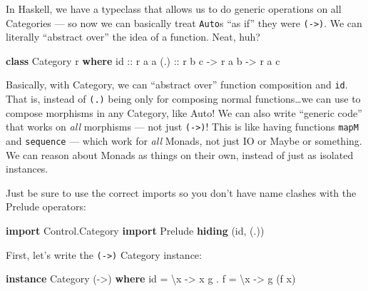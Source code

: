 \documentclass[]{article}
\newenvironment{Shaded}{}{}
\newcommand{\KeywordTok}[1]{\textcolor[rgb]{0.00,0.44,0.13}{\textbf{{#1}}}}
\newcommand{\DataTypeTok}[1]{\textcolor[rgb]{0.56,0.13,0.00}{{#1}}}
\newcommand{\OtherTok}[1]{\textcolor[rgb]{0.00,0.44,0.13}{{#1}}}
\newcommand{\FunctionTok}[1]{\textcolor[rgb]{0.02,0.16,0.49}{{#1}}}
\newcommand{\NormalTok}[1]{{#1}}
\begin{document}
In Haskell, we have a typeclass that allows us to do generic operations
on all Categories --- so now we can basically treat \texttt{Auto}s ``as
if'' they were \texttt{(-\textgreater{})}. We can literally ``abstract
over'' the idea of a function. Neat, huh?

\begin{Shaded}
\begin{Highlighting}[]
\KeywordTok{class} \DataTypeTok{Category} \NormalTok{r }\KeywordTok{where}
\OtherTok{    id  ::} \NormalTok{r a a}
\OtherTok{    (.) ::} \NormalTok{r b c }\OtherTok{->} \NormalTok{r a b }\OtherTok{->} \NormalTok{r a c}
\end{Highlighting}
\end{Shaded}

Basically, with Category, we can ``abstract over'' function composition
and \texttt{id}. That is, instead of \texttt{(.)} being only for
composing normal functions\ldots{}we can use to compose morphisms in any
Category, like Auto! We can also write ``generic code'' that works on
\emph{all} morphisms --- not just \texttt{(-\textgreater{})}! This is
like having functions \texttt{mapM} and \texttt{sequence} --- which work
for \emph{all} Monads, not just IO or Maybe or something. We can reason
about Monads as things on their own, instead of just as isolated
instances.

Just be sure to use the correct imports so you don't have name clashes
with the Prelude operators:

\begin{Shaded}
\begin{Highlighting}[]
\KeywordTok{import }\DataTypeTok{Control.Category}
\KeywordTok{import }\DataTypeTok{Prelude} \KeywordTok{hiding} \NormalTok{(id, (.))}
\end{Highlighting}
\end{Shaded}

First, let's write the \texttt{(-\textgreater{})} Category instance:

\begin{Shaded}
\begin{Highlighting}[]
\KeywordTok{instance} \DataTypeTok{Category} \NormalTok{(}\OtherTok{->}\NormalTok{) }\KeywordTok{where}
    \NormalTok{id    }\FunctionTok{=} \NormalTok{\textbackslash{}x }\OtherTok{->} \NormalTok{x}
    \NormalTok{g }\FunctionTok{.} \NormalTok{f }\FunctionTok{=} \NormalTok{\textbackslash{}x }\OtherTok{->} \NormalTok{g (f x)}
\end{Highlighting}
\end{Shaded}
\end{document}
